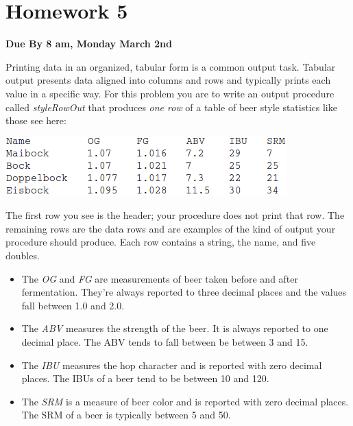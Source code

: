 \documentclass[]{tufte-handout}
\begin{document}
\newpage

\section{Homework 5}

\begin{center}
\textbf{Due By 8 am, Monday March 2nd}
\end{center}

Printing data in an organized, tabular form is a common output task.  Tabular output presents data aligned into columns and rows and typically prints each value in a specific way.  For this problem you are to write an output procedure called \textit{styleRowOut} that produces \textit{one row} of a table of beer style statistics like those see here:

\vspace{.1in}
\begin{center}
\includegraphics[scale=.5]{tabExample.png}
\end{center}
\vspace{.1in}

The first row you see is the header; your procedure does not print that row. The remaining rows are the data rows and are examples of the kind of output your procedure should produce. Each row contains a string, the name, and five doubles.
\begin{itemize}
\item  The \textit{OG} and \textit{FG} are measurements of beer taken before and after fermentation. They're always reported to three decimal places and the values fall between 1.0 and 2.0. 
\item The \textit{ABV} measures the strength of the beer. It is always reported to one decimal place. The ABV tends to fall between be between 3 and 15.
\item The \textit{IBU} measures the hop character and is reported with zero decimal places. The IBUs of a beer tend to be between 10 and 120.
\item The \textit{SRM} is a measure of beer color and is reported with zero decimal places. The SRM of a beer is typically between 5 and 50. 
\end{itemize}
\end{document}
